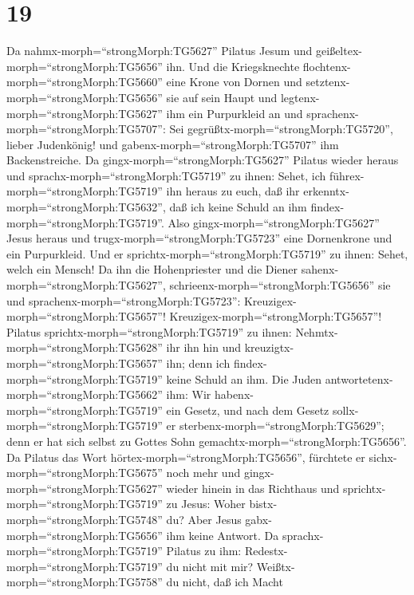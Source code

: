 \hypertarget{section-18}{%
\section{19}\label{section-18}}

 Da nahmx-morph=``strongMorph:TG5627'' Pilatus Jesum und
geißeltex-morph=``strongMorph:TG5656'' ihn.  Und die
Kriegsknechte flochtenx-morph=``strongMorph:TG5660'' eine Krone von
Dornen und setztenx-morph=``strongMorph:TG5656'' sie auf sein Haupt und
legtenx-morph=``strongMorph:TG5627'' ihm ein Purpurkleid an 
und sprachenx-morph=``strongMorph:TG5707'': Sei
gegrüßtx-morph=``strongMorph:TG5720'', lieber Judenkönig! und
gabenx-morph=``strongMorph:TG5707'' ihm Backenstreiche.  Da
gingx-morph=``strongMorph:TG5627'' Pilatus wieder heraus und
sprachx-morph=``strongMorph:TG5719'' zu ihnen: Sehet, ich
führex-morph=``strongMorph:TG5719'' ihn heraus zu euch, daß ihr
erkenntx-morph=``strongMorph:TG5632'', daß ich keine Schuld an ihm
findex-morph=``strongMorph:TG5719''.  Also
gingx-morph=``strongMorph:TG5627'' Jesus heraus und
trugx-morph=``strongMorph:TG5723'' eine Dornenkrone und ein Purpurkleid.
Und er sprichtx-morph=``strongMorph:TG5719'' zu ihnen: Sehet, welch ein
Mensch!  Da ihn die Hohenpriester und die Diener
sahenx-morph=``strongMorph:TG5627'',
schrieenx-morph=``strongMorph:TG5656'' sie und
sprachenx-morph=``strongMorph:TG5723'':
Kreuzigex-morph=``strongMorph:TG5657''!
Kreuzigex-morph=``strongMorph:TG5657''! Pilatus
sprichtx-morph=``strongMorph:TG5719'' zu ihnen:
Nehmtx-morph=``strongMorph:TG5628'' ihr ihn hin und
kreuzigtx-morph=``strongMorph:TG5657'' ihn; denn ich
findex-morph=``strongMorph:TG5719'' keine Schuld an ihm. 
Die Juden antwortetenx-morph=``strongMorph:TG5662'' ihm: Wir
habenx-morph=``strongMorph:TG5719'' ein Gesetz, und nach dem Gesetz
sollx-morph=``strongMorph:TG5719'' er
sterbenx-morph=``strongMorph:TG5629''; denn er hat sich selbst zu Gottes
Sohn gemachtx-morph=``strongMorph:TG5656''.  Da Pilatus das
Wort hörtex-morph=``strongMorph:TG5656'', fürchtete er
sichx-morph=``strongMorph:TG5675'' noch mehr  und
gingx-morph=``strongMorph:TG5627'' wieder hinein in das Richthaus und
sprichtx-morph=``strongMorph:TG5719'' zu Jesus: Woher
bistx-morph=``strongMorph:TG5748'' du? Aber Jesus
gabx-morph=``strongMorph:TG5656'' ihm keine Antwort.  Da
sprachx-morph=``strongMorph:TG5719'' Pilatus zu ihm:
Redestx-morph=``strongMorph:TG5719'' du nicht mit mir?
Weißtx-morph=``strongMorph:TG5758'' du nicht, daß ich Macht

